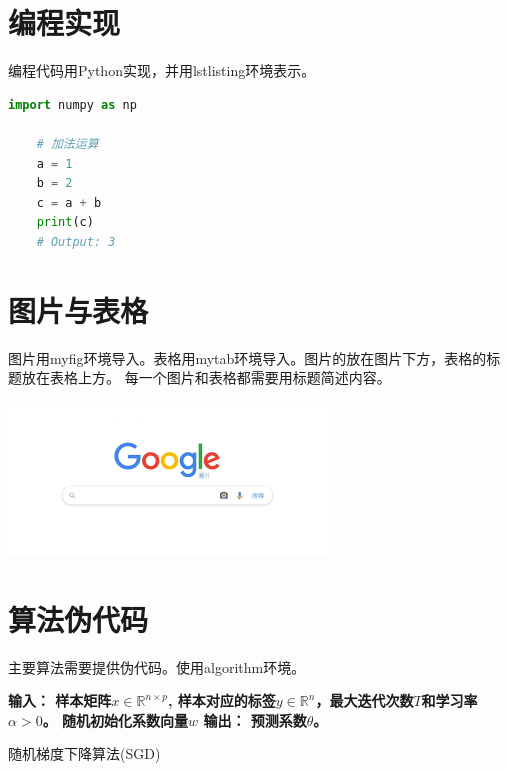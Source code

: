 \documentclass[a4paper,9pt]{extarticle}
\begin{document}
\begin{multicols*}{2}
\section{编程实现}
    编程代码用Python实现，并用lstlisting环境表示。
    \begin{lstlisting}[language=Python]
    import numpy as np
    
    # 加法运算
    a = 1
    b = 2
    c = a + b
    print(c)
    # Output: 3
    \end{lstlisting}
    
\section{图片与表格}
    图片用myfig环境导入。表格用mytab环境导入。图片的放在图片下方，表格的标题放在表格上方。
    每一个图片和表格都需要用标题简述内容。
	
\begin{myfig}[!htb]
  \centering
  \includegraphics[width=\linewidth]{images.png}
\end{myfig}
 
\begin{mytab}[!htb]
\end{mytab}

\section{算法伪代码}
主要算法需要提供伪代码。使用algorithm环境。

\begin{algorithm}[H]
    \SetAlgoLined
    \bfseries{输入：} 样本矩阵$x \in \mathbb{R}^{n \times p}$, 样本对应的标签$y \in \mathbb{R}^n$，最大迭代次数$T$和学习率$\alpha > 0$。
     随机初始化系数向量$w$\;
     \bfseries{输出：} 预测系数$\theta$。
     \caption{随机梯度下降算法(SGD)}
     \label{algo:SGD}
    \end{algorithm}
 

\end{multicols*}
\end{document}
